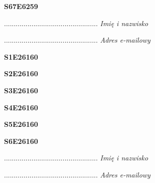 \begin{turn}{90}\huge \textbf{S67E6259}\end{turn}

\begin{turn}{90}\begin{minipage}{\linewidth} \vspace{20mm} ................................................  \textit{Imię i nazwisko}\end{minipage}\end{turn}

\begin{turn}{90}\begin{minipage}{\linewidth} \vspace{20mm} ................................................  \textit{Adres e-mailowy}\end{minipage}\end{turn}

\begin{turn}{90}\huge \textbf{S1E26160}\end{turn}

\begin{turn}{90}\huge \textbf{S2E26160}\end{turn}

\begin{turn}{90}\huge \textbf{S3E26160}\end{turn}

\begin{turn}{90}\huge \textbf{S4E26160}\end{turn}

\begin{turn}{90}\huge \textbf{S5E26160}\end{turn}

\begin{turn}{90}\huge \textbf{S6E26160}\end{turn}

\begin{turn}{90}\begin{minipage}{\linewidth} \vspace{20mm} ................................................  \textit{Imię i nazwisko}\end{minipage}\end{turn}

\begin{turn}{90}\begin{minipage}{\linewidth} \vspace{20mm} ................................................  \textit{Adres e-mailowy}\end{minipage}\end{turn}

